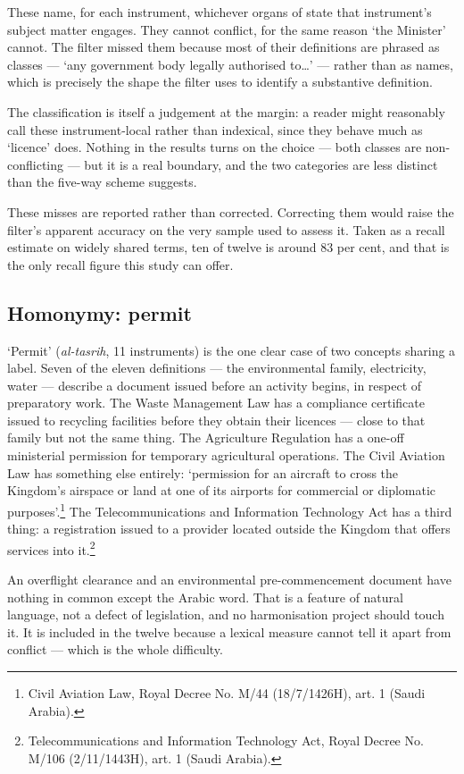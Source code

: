 \documentclass[11pt]{article}
\begin{document}
These name, for each instrument, whichever organs of state that instrument's
subject matter engages. They cannot conflict, for the same reason `the
Minister' cannot. The filter missed them because most of their definitions
are phrased as classes --- `any government body legally authorised
to\ldots' --- rather than as names, which is precisely the shape the filter
uses to identify a substantive definition.

The classification is itself a judgement at the margin: a reader might
reasonably call these instrument-local rather than indexical, since they
behave much as `licence' does. Nothing in the results turns on the choice ---
both classes are non-conflicting --- but it is a real boundary, and the two
categories are less distinct than the five-way scheme suggests.

These misses are reported rather than corrected. Correcting them would raise
the filter's apparent accuracy on the very sample used to assess it. Taken as
a recall estimate on widely shared terms, ten of twelve is around 83 per
cent, and that is the only recall figure this study can offer.

\subsection{Homonymy: permit}
\label{sec:homonymy}

`Permit' (\emph{al-tasrih}, 11 instruments) is the one clear case of two
concepts sharing a label. Seven of the eleven definitions --- the
environmental family, electricity, water --- describe a document issued
before an activity begins, in respect of preparatory work. The Waste Management Law has a compliance certificate issued
to recycling facilities before they obtain their licences --- close to that
family but not the same thing. The Agriculture Regulation has a one-off
ministerial permission for temporary agricultural operations. The Civil Aviation Law has something else entirely: `permission
for an aircraft to cross the Kingdom's airspace or land at one of its
airports for commercial or diplomatic purposes'.\footnote{Civil Aviation Law, Royal Decree No. M/44 (18/7/1426H), art. 1 (Saudi Arabia).} The Telecommunications and
Information Technology Act has a third thing: a registration issued to a
provider located outside the Kingdom that offers services into
it.\footnote{Telecommunications and Information Technology Act, Royal Decree No. M/106 (2/11/1443H), art. 1 (Saudi Arabia).}

An overflight clearance and an environmental pre-commencement document have
nothing in common except the Arabic word. That is a feature of natural
language, not a defect of legislation, and no harmonisation project should
touch it. It is included in the twelve because a lexical measure cannot tell
it apart from conflict --- which is the whole difficulty.
\end{document}
